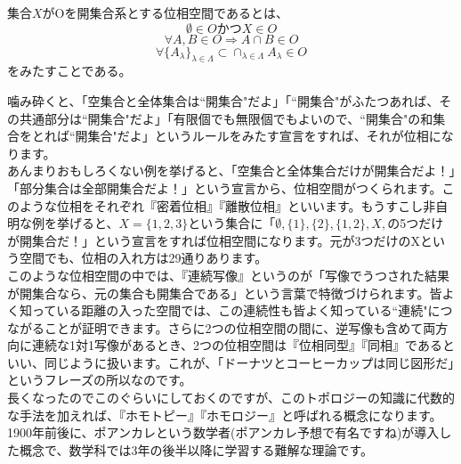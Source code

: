 集合$X$がOを開集合系とする位相空間であるとは、
\[
\emptyset \in O かつ X \in O
\]
\[
\forall A,B \in O \Rightarrow A \cap B \in O
\]
\[
\forall \{A_\lambda\}_{\lambda \in \Lambda} \subset {\cap}_{\lambda \in \Lambda} A_\lambda \in O
\]
をみたすことである。

噛み砕くと、「空集合と全体集合は``開集合"だよ」「``開集合"がふたつあれば、その共通部分は``開集合"だよ」「有限個でも無限個でもよいので、``開集合"の和集合をとれば``開集合"だよ」というルールをみたす宣言をすれば、それが位相になります。\\
あんまりおもしろくない例を挙げると、「空集合と全体集合だけが開集合だよ！」「部分集合は全部開集合だよ！」という宣言から、位相空間がつくられます。このような位相をそれぞれ『密着位相』『離散位相』といいます。もうすこし非自明な例を挙げると、$X = \{1,2,3\}$という集合に「$\emptyset,\{1\},\{2\},\{1,2\},X,$の5つだけが開集合だ！」という宣言をすれば位相空間になります。元が3つだけのXという空間でも、位相の入れ方は29通りあります。\\
このような位相空間の中では、『連続写像』というのが「写像でうつされた結果が開集合なら、元の集合も開集合である」という言葉で特徴づけられます。皆よく知っている距離の入った空間では、この連続性も皆よく知っている``連続"につながることが証明できます。さらに2つの位相空間の間に、逆写像も含めて両方向に連続な1対1写像があるとき、2つの位相空間は『位相同型』『同相』であるといい、同じように扱います。これが、「ドーナツとコーヒーカップは同じ図形だ」というフレーズの所以なのです。\\
長くなったのでこのぐらいにしておくのですが、このトポロジーの知識に代数的な手法を加えれば、『ホモトピー』『ホモロジー』と呼ばれる概念になります。1900年前後に、ポアンカレという数学者(ポアンカレ予想で有名ですね)が導入した概念で、数学科では3年の後半以降に学習する難解な理論です。


